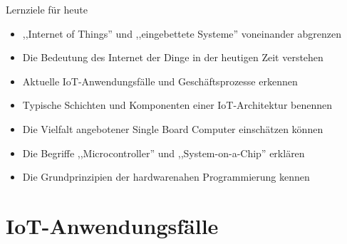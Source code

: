\begin{frame}{Lernziele für heute}
    \begin{itemize}
        \item ,,Internet of Things'' und ,,eingebettete Systeme'' voneinander abgrenzen
        \item Die Bedeutung des Internet der Dinge in der heutigen Zeit verstehen
        \item Aktuelle IoT-Anwendungsfälle und Geschäftsprozesse erkennen
        \item Typische Schichten und Komponenten einer IoT-Architektur benennen
        \item Die Vielfalt angebotener Single Board Computer einschätzen können
        \item Die Begriffe ,,Microcontroller'' und ,,System-on-a-Chip'' erklären
        \item Die Grundprinzipien der hardwarenahen Programmierung kennen
    \end{itemize}
\end{frame}

\section{IoT-Anwendungsfälle}

